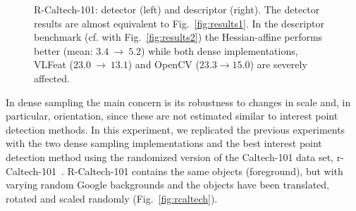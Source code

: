 \documentclass[review]{elsarticle}
\begin{document}
\begin{figure}
  \begin{center}
\caption{R-Caltech-101: detector (left) and descriptor (right).
The detector results are almost equivalent to Fig.~\ref{fig:results1}.
In the descriptor benchmark (cf. with Fig.~\ref{fig:results2}) the
Hessian-affine performs better
(mean: $3.4~\rightarrow~5.2$) while both dense implementations,
VLFeat ($23.0~\rightarrow~13.1$) and OpenCV ($23.3\rightarrow 15.0$) are
severely affected.}
\label{fig:rcaltechcomparison}
\end{center}
\end{figure}
%
In dense sampling the main concern is its robustness to changes
in scale and, in particular, orientation, since these are not
estimated similar to interest point detection methods. In this experiment,
we replicated the previous experiments with the two dense sampling
implementations and the best interest point detection method using the
randomized version of the Caltech-101 data set, r-Caltech-101~\cite{KinKamLen:2010}.
R-Caltech-101 contains the same objects (foreground), but with varying
random Google backgrounds and the objects have been translated, rotated
and scaled randomly (Fig.~\ref{fig:rcaltech}).
\end{document}
